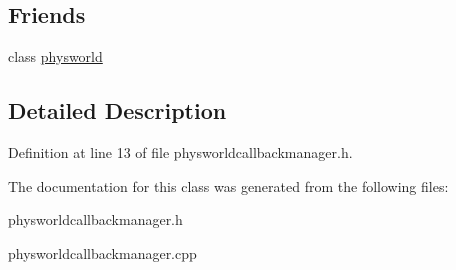 \subsection*{Friends}
\begin{DoxyCompactItemize}
\item 
\hypertarget{classphysworldCallBackManager_ae7904c25f4b17553764598ea1ae5327b}{
class \hyperlink{classphysworldCallBackManager_ae7904c25f4b17553764598ea1ae5327b}{physworld}}
\label{d8/d84/classphysworldCallBackManager_ae7904c25f4b17553764598ea1ae5327b}

\end{DoxyCompactItemize}


\subsection{Detailed Description}


Definition at line 13 of file physworldcallbackmanager.h.

The documentation for this class was generated from the following files:\begin{DoxyCompactItemize}
\item 
physworldcallbackmanager.h\item 
physworldcallbackmanager.cpp\end{DoxyCompactItemize}
